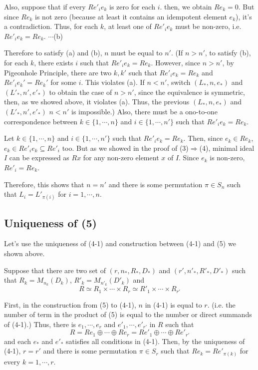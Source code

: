Also, suppose that if every \(Re'_ie_k\) is zero for each \(i\).
then, we obtain \(R e_k = 0\).
But since \(R e_k\) is not zero (because at least it contains an idempotent
element \(e_k\)),
it's a contradiction.
Thus, for each \(k\), at least one of \(Re'_ie_k\)
must be non-zero, i.e. \(Re'_ie_k = Re_k\). \(\cdots\)(b)

Therefore to satisfy (a) and (b),
\(n\) must be equal to \(n'\).
(If \(n > n'\),
to satisfy (b),
for each \(k\),
there exists \(i\) such that \(Re'_ie_k = Re_k\).
However, since \(n > n'\), by Pigeonhole Principle,
there are two \(k, k'\) such that
\(Re'_ie_k = Re_k\) and \(Re'_ie_k' = Re_k'\) for some \(i\).
This violates (a).
If \(n < n'\),
switch \((L_*, n, e_*)\) and \((L'_*, n', e'_*)\)
to obtain the case of \(n > n'\), since the equivalence is symmetric,
then, as we showed above, it violates (a).
Thus, the previous \((L_*, n, e_*)\) and \((L'_*, n', e'_*)\)
\(n < n'\) is impossible.)
Also, there must be a ono-to-one correspondence between \(k \in \{1, \cdots, n\}\) and \(i \in \{1, \cdots, n'\}\) such that \(Re'_ie_k = Re_k\).

Let \(k \in \{1, \cdots, n\}\) and \(i \in \{1, \cdots, n'\}\) such that \(Re'_ie_k = Re_k\).
Then, since \(e_k \in Re_k\), \(e_k \in Re'_i e_k \subseteq Re'_i\) too.
But as we showed in the proof of (3)\(\Rightarrow\)(4),
minimal ideal \(I\) can be expressed as \(Rx\) for any non-zero element \(x\)
of \(I\).
Since \(e_k\) is non-zero,
\(Re'_i = Re_k\).

Therefore, this shows that \(n = n'\) and there is some permutation
\(\pi \in S_n\) such that \(L_i = L'_{\pi(i)}\) for \(i = 1, \cdots, n\).
\qedsq

\subsection*{Uniqueness of (5)}

Let's use the uniqueness of (4-1) and construction between (4-1) and (5)
we shown above.

Suppose that there are two set of
\((r, n_*, R_*, D_*)\)
and
\((r', n'_*, R'_*, D'_*)\)
such that
\(R_k = M_{n_k}(D_k)\), 
\(R'_k = M_{n'_k}(D'_k)\)
and
\[R \simeq R_1 \times \cdots \times R_r \simeq R'_1 \times \cdots \times R_{r'}\]

First, in the construction from (5) to (4-1),
\(n\) in (4-1) is equal to \(r\).
(i.e. the number of term in the product of (5) is equal to
the number or direct summands of (4-1).)
Thus, there is \(e_1, \cdots, e_r\) and \(e'_1, \cdots, e'_{r'}\) in \(R\)
such that
\[R = R e_1 \oplus \cdots \oplus R e_r = R e'_1 \oplus \cdots \oplus R e'_{r'}\]
and each \(e_*\) and \(e'_*\) satisfies all conditions in (4-1).
Then, by the uniqueness of (4-1),
\(r = r'\) and there is some permutation \(\pi \in S_r\) such that
\(R e_k = R e'_{\pi(k)}\)
for every \(k = 1, \cdots, r\).

